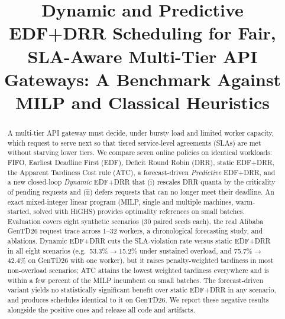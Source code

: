 \documentclass[conference]{IEEEtran}
\begin{document}
\title{Dynamic and Predictive EDF+DRR Scheduling for Fair, SLA-Aware Multi-Tier API Gateways: A Benchmark Against MILP and Classical Heuristics}

\author{
\and
{}
}

\maketitle

\begin{abstract}
A multi-tier API gateway must decide, under bursty load and limited worker capacity, which request to serve next so that tiered service-level agreements (SLAs) are met without starving lower tiers. We compare seven online policies on identical workloads: FIFO, Earliest Deadline First (EDF), Deficit Round Robin (DRR), static EDF+DRR, the Apparent Tardiness Cost rule (ATC), a forecast-driven \emph{Predictive} EDF+DRR, and a new closed-loop \emph{Dynamic} EDF+DRR that (i) rescales DRR quanta by the criticality of pending requests and (ii) defers requests that can no longer meet their deadline. An exact mixed-integer linear program (MILP, single and multiple machines, warm-started, solved with HiGHS) provides optimality references on small batches. Evaluation covers eight synthetic scenarios (30 paired seeds each), the real Alibaba GenTD26 request trace across 1--32 workers, a chronological forecasting study, and ablations. Dynamic EDF+DRR cuts the SLA-violation rate versus static EDF+DRR in all eight scenarios (e.g.\ 53.3\%$\to$15.2\% under sustained overload, and 75.7\%$\to$42.4\% on GenTD26 with one worker), but it raises penalty-weighted tardiness in most non-overload scenarios; ATC attains the lowest weighted tardiness everywhere and is within a few percent of the MILP incumbent on small batches. The forecast-driven variant yields no statistically significant benefit over static EDF+DRR in any scenario, and produces schedules identical to it on GenTD26. We report these negative results alongside the positive ones and release all code and artifacts.
\end{abstract}
\end{document}
